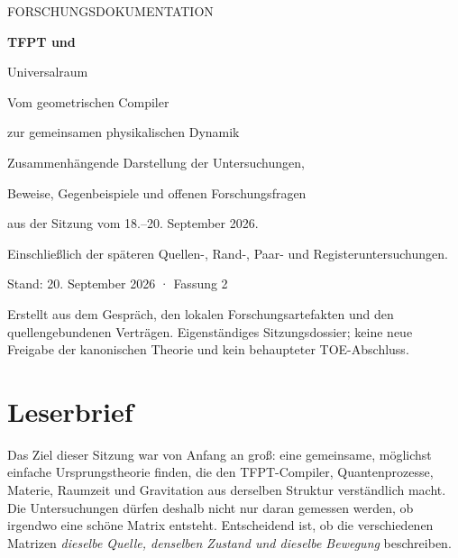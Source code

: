 
\hypersetup{pageanchor=false}
\begin{titlepage}
\color{ink}
{\sffamily\large FORSCHUNGSDOKUMENTATION\par}
\vspace{17mm}
{\sffamily\bfseries\fontsize{32}{37}\selectfont TFPT und\par Universalraum\par}
\vspace{7mm}
{\sffamily\Large Vom geometrischen Compiler\par zur gemeinsamen physikalischen Dynamik\par}
\vspace{12mm}
\par
\vspace{9mm}
{\large Zusammenhängende Darstellung der Untersuchungen,\par Beweise, Gegenbeispiele und offenen Forschungsfragen\par aus der Sitzung vom 18.--20. September 2026.\par}
\vspace{3mm}
{\small Einschließlich der späteren Quellen-, Rand-, Paar- und Registeruntersuchungen.\par}
\vfill
{}
\vspace{5mm}
{\sffamily Stand: 20. September 2026 · Fassung 2\par}
{\small Erstellt aus dem Gespräch, den lokalen Forschungsartefakten und den quellengebundenen Verträgen. Eigenständiges Sitzungsdossier; keine neue Freigabe der kanonischen Theorie und kein behaupteter TOE-Abschluss.\par}
\end{titlepage}
\hypersetup{pageanchor=true}
\chapter*{Leserbrief}
Das Ziel dieser Sitzung war von Anfang an groß: eine gemeinsame, möglichst einfache Ursprungstheorie finden, die den TFPT-Compiler, Quantenprozesse, Materie, Raumzeit und Gravitation aus derselben Struktur verständlich macht. Die Untersuchungen dürfen deshalb nicht nur daran gemessen werden, ob irgendwo eine schöne Matrix entsteht. Entscheidend ist, ob die verschiedenen Matrizen \emph{dieselbe Quelle, denselben Zustand und dieselbe Bewegung} beschreiben.

